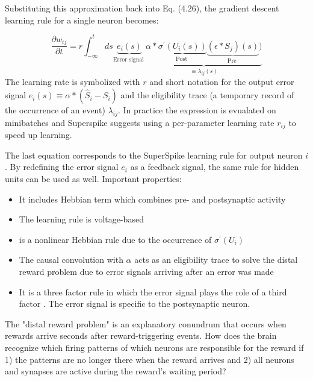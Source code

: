 \documentclass[12pt]{report}
\begin{document}
Substituting this approximation back into Eq. (4.26), the gradient descent learning rule for a single neuron becomes:

\begin{equation}
\label{eqn:superspike}
\frac{\partial w_{i j}}{\partial t}=r \int_{-\infty}^{t} d s \underbrace{e_{i}(s)}_{\text {Error signal }} \underbrace{\alpha * \underbrace{\sigma^{\prime}\left(U_{i}(s)\right)}_{\text {Post }} \underbrace{\left(\epsilon * S_{j}\right)(s)}_{\text {Pre }})}_{\equiv \lambda_{i j}(s)}
\end{equation}
The learning rate is symbolized with $r$ and short notation for the output error signal $e_{i}(s) \equiv \alpha *\left(\hat{S}_{i}-S_{i}\right)$ and the eligibility trace (a temporary
record of the occurrence of an event)  $\lambda_{i j} .$ In practice the expression  is evualated on minibatches and Superspike suggests using a per-parameter learning rate $r_{i j}$ to speed up learning.

The last equation corresponds to the SuperSpike learning rule for output neuron $i$. 
By redefining the error signal $e_{i}$ as a feedback signal, the same rule for hidden units can be used as well. Important properties: 
\begin{itemize}
  \item It includes Hebbian term which combines pre- and postsynaptic activity
  \item The learning rule is voltage-based
  \item is a nonlinear Hebbian rule due to the occurrence of $\sigma^{\prime}\left(U_{i}\right)$
  \item The causal convolution with $\alpha$ acts as an eligibility trace to solve the distal reward problem due to error signals arriving after an error was made \cite{izike2007} 
  \item It is a three factor rule in which the error signal plays the role of a third factor \cite{fremaux2016} . The error signal is specific to the postsynaptic neuron.
\end{itemize}
The "distal reward problem" is an explanatory conundrum  that occurs when rewards arrive seconds after reward-triggering events. How does the brain recognize which firing patterns of which neurons are responsible for the reward if 1) the patterns are no longer there when the reward arrives and 2) all neurons and synapses are active during the reward's waiting period?
\end{document}
